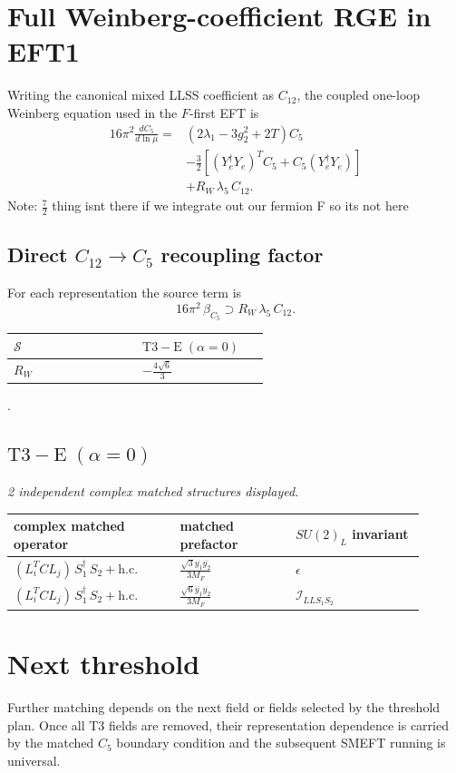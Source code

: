 \documentclass[9pt]{article}
\begin{document}
\section*{Full Weinberg-coefficient RGE in EFT1}
Writing the canonical mixed LLSS coefficient as $C_{12}$, the coupled one-loop Weinberg equation used in the $F$-first EFT is
\begin{align}
16\pi^2\frac{dC_5}{d\ln\mu}={}&(2\lambda_1-3g_2^2+2T)C_5\\
&-\frac32\left[(Y_e^\dagger Y_e)^T C_5+C_5(Y_e^\dagger Y_e)\right]\\
&+R_W\,\lambda_5\,C_{12}.
\end{align}
Note: $\frac{7}{2}$ thing isnt there if we integrate out our fermion F so its not here \subsection*{Direct $C_{12}\to C_5$ recoupling factor}
For each representation the source term is
\[16\pi^2\,\beta_{C_5}\supset R_W\,\lambda_5\,C_{12}.\]
\begin{longtable}{@{}p{0.37\linewidth}p{0.19\linewidth}@{}}
\toprule
$\mathcal{S}$ & $ \mathrm{T3-E}\;(\alpha=0) $ \\
\midrule
$R_W$ & $ - \frac{4 \sqrt{6}}{3} $ \\
\bottomrule
\end{longtable}
.
\subsection*{$ \mathrm{T3-E}\;(\alpha=0) $}
\textit{2 independent complex matched structures displayed. }
\begin{longtable}{@{}p{0.36\linewidth}p{0.25\linewidth}p{0.29\linewidth}@{}}
\toprule
complex matched operator & matched prefactor & $SU(2)_L$ invariant \\
\midrule
$ (L_i^T C L_j)\,S_1^\dagger\,S_2+\mathrm{h.c.} $ & $ \frac{\sqrt{3} \overline{y_{1}} \overline{y_{2}}}{3 M_F} $ & $ \epsilon $ \\
$ (L_i^T C L_j)\,S_1^\dagger\,S_2+\mathrm{h.c.} $ & $ \frac{\sqrt{6} \overline{y_{1}} \overline{y_{2}}}{3 M_F} $ & $ \mathcal{I}_{LLS_1S_2} $ \\
\bottomrule
\end{longtable}
\section*{Next threshold}
Further matching depends on the next field or fields selected by the threshold plan.  Once all T3 fields are removed, their representation dependence is carried by the matched $C_5$ boundary condition and the subsequent SMEFT running is universal.
\end{document}
